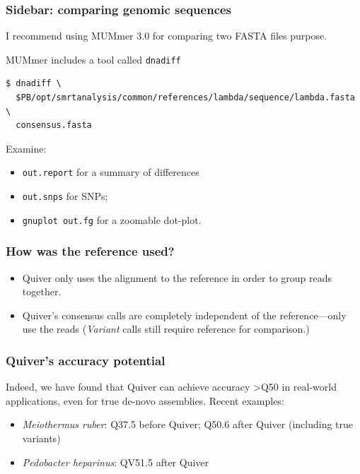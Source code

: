 \documentclass[11pt,serif]{beamer}
\begin{document}
\begin{frame}[fragile]\frametitle{Sidebar: comparing genomic sequences}
\label{sec-2-3}

I recommend using MUMmer 3.0 for comparing two FASTA files purpose. \newline

MUMmer includes a tool called \verb~dnadiff~

\begin{scriptsize}
\begin{verbatim}
$ dnadiff \
  $PB/opt/smrtanalysis/common/references/lambda/sequence/lambda.fasta \
  consensus.fasta
\end{verbatim}
\end{scriptsize}

Examine:
\begin{itemize}
\item \verb~out.report~ for a summary of differences
\item \verb~out.snps~ for SNPs;
\item \verb~gnuplot out.fg~ for a zoomable dot-plot.
\end{itemize}
\end{frame}
\begin{frame}[fragile]\frametitle{How was the reference used?}
\label{sec-2-4}

\begin{itemize}
\item Quiver only uses the alignment to the reference in order to group
  reads together.
\item Quiver's consensus calls are completely independent of
  the reference---only use the reads (\emph{Variant} calls still require
  reference for comparison.)
\end{itemize}
\end{frame}
\begin{frame}[fragile]\frametitle{Quiver's accuracy potential}
\label{sec-2-5}

   Indeed, we have found that Quiver can achieve accuracy >Q50 in
   real-world applications, even for true de-novo assemblies.  Recent
   examples:
\begin{itemize}
\item \emph{Meiothermus ruber}: Q37.5 before Quiver; Q50.6 after Quiver
     (including true variants)
\item \emph{Pedobacter heparinus}: QV51.5 after Quiver
\end{itemize}
\end{frame}
\end{document}
